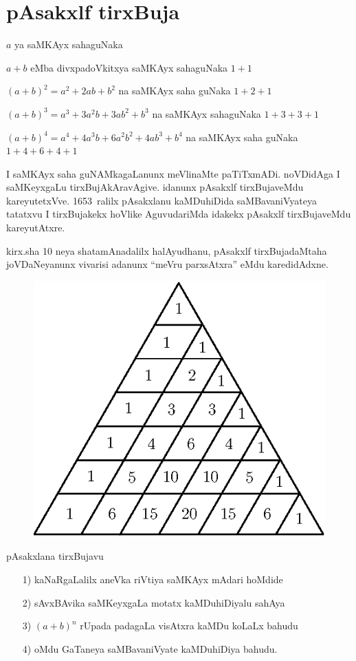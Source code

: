 \chapter{pAsakxlf tirxBuja}

\noindent
$a$ ya saMKAyx sahaguNaka 

\noindent
$a+b$ eMba divxpadoVkitxya saMKAyx sahaguNaka \quad $1+1$

\noindent
$(a+b)^2=a^2+2ab+b^2$ na saMKAyx saha guNaka \quad $1+2+1$

\noindent
$(a+b)^3=a^3+3a^2b+3ab^2+b^3$ na saMKAyx sahaguNaka \quad $1+3+3+1$

\noindent
$(a+b)^4=a^4+4a^3b+6a^2b^2+4ab^3+b^4$ na saMKAyx saha guNaka \quad $1+4+6+4+1$

I saMKAyx saha guNAMkagaLanunx meVlinaMte paTiTxmADi. noVDidAga I saMKeyxgaLu tirxBujAkAravAgive. idanunx pAsakxlf tirxBujaveMdu kareyutetxVve. {\rm 1653}~ralilx pAsakxlanu kaMDuhiDida saMBavaniVyateya tatatxvu I tirxBujakekx hoVlike AguvudariMda idakekx pAsakxlf tirxBujaveMdu kareyutAtxre.

kirx.sha {\rm 10} neya shatamAnadalilx halAyudhanu, pAsakxlf tirxBujadaMtaha joVDaNe\-yanunx vivarisi adanunx ``meVru parxsAtxra'' eMdu karedidAdxne.
\begin{figure}[H]
\centering
\includegraphics[scale=.8]{src/figures/m_151.eps}
\end{figure}

pAsakxlana tirxBujavu
\begin{enumerate}
\item[{\rm 1)}] kaNaRgaLalilx aneVka riVtiya saMKAyx mAdari hoMdide
\item[{\rm 2)}] sAvxBAvika saMKeyxgaLa motatx kaMDuhiDiyalu sahAya
\item[{\rm 3)}] $(a+b)^n$ rUpada padagaLa visAtxra kaMDu koLaLx bahudu
\item[{\rm 4)}] oMdu GaTaneya saMBavaniVyate kaMDuhiDiya bahudu.
\end{enumerate}

